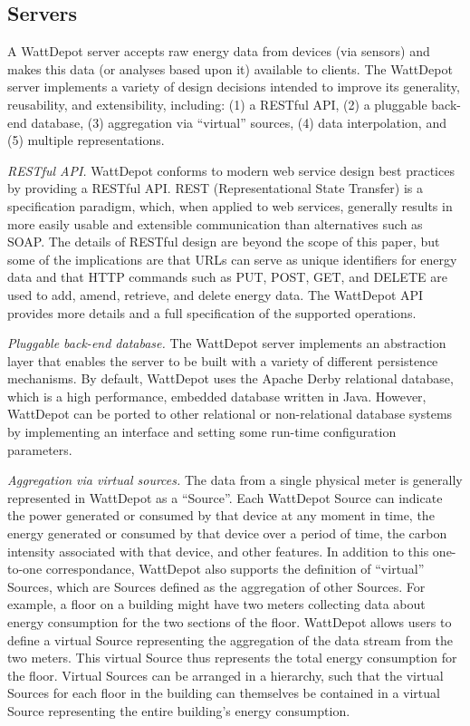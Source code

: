 \documentclass[conference,compsoc]{IEEEtran}
\begin{document}
\subsection{Servers}

A WattDepot server accepts raw energy data from devices (via sensors) and
makes this data (or analyses based upon it) available to clients.  The
WattDepot server implements a variety of design decisions intended to
improve its generality, reusability, and extensibility, including: (1) a
RESTful API, (2) a pluggable back-end database, (3) aggregation via
``virtual'' sources, (4) data interpolation, and (5) multiple
representations.

{\em RESTful API.} WattDepot conforms to modern web service design best
practices by providing a RESTful API.  REST (Representational State
Transfer) \cite{REST} is a specification paradigm, which, when applied to
web services, generally results in more easily usable and extensible
communication than alternatives such as SOAP. The details of RESTful design
are beyond the scope of this paper, but some of the implications are that
URLs can serve as unique identifiers for energy data and that HTTP commands
such as PUT, POST, GET, and DELETE are used to add, amend, retrieve, and
delete energy data. The WattDepot API \cite{WattDepotAPI} provides more
details and a full specification of the supported operations.

{\em Pluggable back-end database.} The WattDepot server implements an
abstraction layer that enables the server to be built with a variety of
different persistence mechanisms.  By default, WattDepot uses the Apache
Derby relational database, which is a high performance, embedded database
written in Java.  However, WattDepot can be ported to other relational or
non-relational database systems by implementing an interface and setting some 
run-time configuration parameters. 

{\em Aggregation via virtual sources.} The data from a single physical
meter is generally represented in WattDepot as a ``Source''.  Each
WattDepot Source can indicate the power generated or consumed by that
device at any moment in time, the energy generated or consumed by that
device over a period of time, the carbon intensity associated with that
device, and other features.  In addition to this one-to-one correspondance,
WattDepot also supports the definition of ``virtual'' Sources, which are
Sources defined as the aggregation of other Sources.  For example, a floor
on a building might have two meters collecting data about energy
consumption for the two sections of the floor.  WattDepot allows users to
define a virtual Source representing the aggregation of the data stream
from the two meters.  This virtual Source thus represents the total energy
consumption for the floor. Virtual Sources can be arranged in a hierarchy,
such that the virtual Sources for each floor in the building can themselves
be contained in a virtual Source representing the entire building's energy
consumption.
\end{document}
